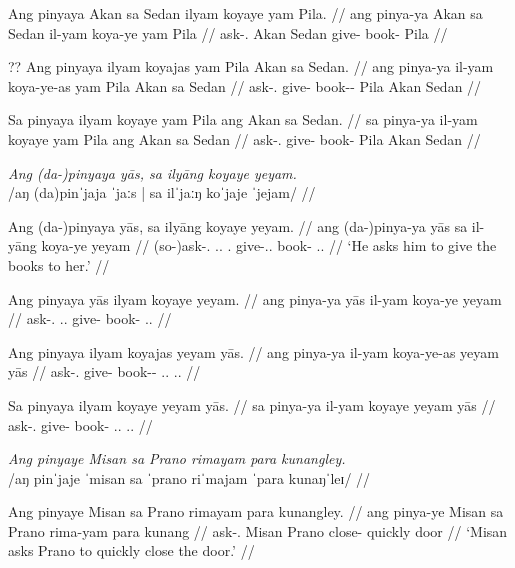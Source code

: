 \documentclass[12pt,a4paper]{scrartcl}
\newcommand{\PatTI}{{\PatT}.{\Inan}}
\newcommand{\TsgM}{{\Tsg}.{\M}}
\newcommand{\TsgF}{{\Tsg}.{\F}}
\begin{document}
\a\begingl
\gla Ang pinyaya Akan sa Sedan ilyam koyaye yam Pila. //
\glb ang pinya-ya Akan sa Sedan il-yam koya-ye yam Pila //
\glc \AgtT{} ask-\TsgM{} Akan \Parg{} Sedan give-\Ptcp{} book-\Pl{} \Dat{} Pila //
\endgl

\a\ljudge??\begingl
\gla Ang pinyaya ilyam koyajas yam Pila Akan sa Sedan. //
\glb ang pinya-ya il-yam koya-ye-as yam Pila Akan sa Sedan //
\glc \AgtT{} ask-\TsgM{} give-\Ptcp{} book-\Pl{}-\Parg{} \Dat{} Pila Akan \Parg{} Sedan //
\endgl

\a\ljudge*\begingl
\gla Sa pinyaya ilyam koyaye yam Pila ang Akan sa Sedan. //
\glb sa pinya-ya il-yam koyaye yam Pila ang Akan sa Sedan //
\glc \PatT{} ask-\TsgM{} give-\Ptcp{} book-\Pl{} \Dat{} Pila \Aarg{} Akan \Parg{} Sedan //
\endgl
\xe

\pex
\a\begingl
\glpreamble \textit{Ang (da-)pinyaya yās, sa ilyāng koyaye yeyam.} \\
	/aŋ (da)pinˈjaja ˈjaːs | sa ilˈjaːŋ koˈjaje ˈjejam/ //

\gla Ang (da-)pinyaya yās, sa ilyāng koyaye yeyam. //
\glb ang (da-)pinya-ya yās sa il-yāng koya-ye yeyam //
\glc \AgtT{} (so-)ask-\TsgM{} \TsgM{}.\Parg{} \PatTI{} give-\TsgM{}.\Aarg{} book-\Pl{} \TsgF{}.\Dat{} //
\glft `He asks him to give the books to her.' //
\endgl

\a\begingl
\gla Ang pinyaya yās ilyam koyaye yeyam. //
\glb ang pinya-ya yās il-yam koya-ye yeyam //
\glc \AgtT{} ask-\TsgM{} \TsgM{}.\Parg{} give-\Ptcp{} book-\Pl{} \TsgF{}.\Dat{} //
\endgl

\a\ljudge*\begingl
\gla Ang pinyaya ilyam koyajas yeyam yās. //
\glb ang pinya-ya il-yam koya-ye-as yeyam yās //
\glc \AgtT{} ask-\TsgM{} give-\Ptcp{} book-\Pl{}-\Parg{} \TsgF{}.\Dat{} \TsgM{}.\Parg{} //
\endgl

\a\ljudge*\begingl
\gla Sa pinyaya ilyam koyaye yeyam yās. //
\glb sa pinya-ya il-yam koyaye yeyam yās //
\glc \PatT{} ask-\TsgM{} give-\Ptcp{} book-\Pl{} \TsgF{}.\Dat{} \TsgM{}.\Parg{} //
\endgl
\xe

\ex\begingl
\glpreamble \textit{Ang pinyaye Misan sa Prano rimayam para kunangley.} \\
	/aŋ pinˈjaje ˈmisan sa ˈprano riˈmajam ˈpara kunaŋˈleɪ/ //

\gla Ang pinyaye Misan sa Prano rimayam para kunangley. //
\glb ang pinya-ye Misan sa Prano rima-yam para kunang //
\glc \AgtT{} ask-\TsgF{} Misan \Parg{} Prano close-\Ptcp{} quickly door //
\glft `Misan asks Prano to quickly close the door.' //
\endgl\xe
\end{document}
